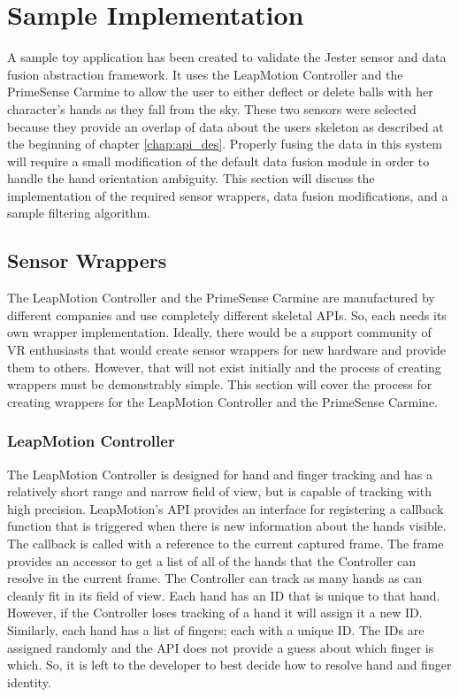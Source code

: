 \chapter{Sample Implementation}\label{chap:sample_app}

A sample toy application has been created to validate the Jester sensor and data fusion abstraction framework. It uses the LeapMotion Controller and the PrimeSense Carmine to allow the user to either deflect or delete balls with her character's hands as they fall from the sky. These two sensors were selected because they provide an overlap of data about the users skeleton as described at the beginning of chapter \ref{chap:api_des}. Properly fusing the data in this system will require a small modification of the default data fusion module in order to handle the hand orientation ambiguity. This section will discuss the implementation of the required sensor wrappers, data fusion modifications, and a sample filtering algorithm.

\section{Sensor Wrappers}

The LeapMotion Controller and the PrimeSense Carmine are manufactured by different companies and use completely different skeletal APIs. So, each needs its own wrapper implementation. Ideally, there would be a support community of VR enthusiasts that would create sensor wrappers for new hardware and provide them to others. However, that will not exist initially and the process of creating wrappers must be demonstrably simple. This section will cover the process for creating wrappers for the LeapMotion Controller and the PrimeSense Carmine.

\subsection{LeapMotion Controller}\label{sec:leap_impl}

The LeapMotion Controller is designed for hand and finger tracking and has a relatively short range and narrow field of view, but is capable of tracking with high precision. LeapMotion's API provides an interface for registering a callback function that is triggered when there is new information about the hands visible. The callback is called with a reference to the current captured frame. The frame provides an accessor to get a list of all of the hands that the Controller can resolve in the current frame. The Controller can track as many hands as can cleanly fit in its field of view. Each hand has an ID that is unique to that hand. However, if the Controller loses tracking of a hand it will assign it a new ID. Similarly, each hand has a list of fingers; each with a unique ID. The IDs are assigned randomly and the API does not provide a guess about which finger is which. So, it is left to the developer to best decide how to resolve hand and finger identity.

